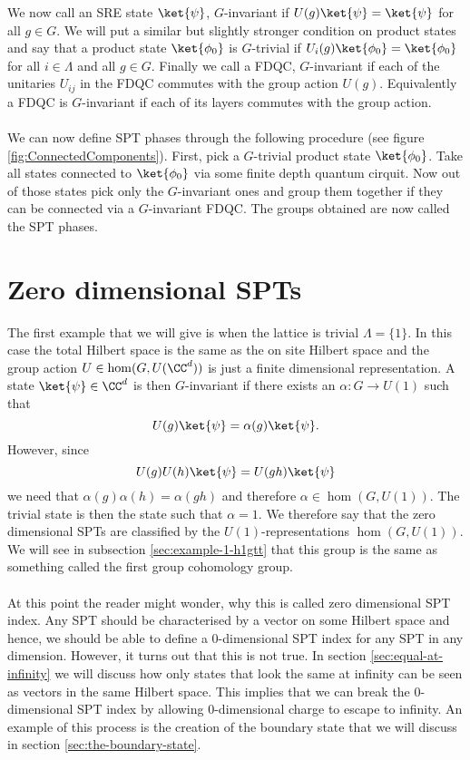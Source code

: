We now call an SRE state $\ket{\psi}$, $G$-invariant if $U(g)\ket{\psi}=\ket{\psi}$ for all $g\in G$. We will put a similar but slightly stronger condition on product states and say that a product state $\ket{\phi_0}$ is $G$-trivial if $U_i(g)\ket{\phi_0}=\ket{\phi_0}$ for all $i\in\Lambda$ and all $g\in G$. Finally we call a FDQC, $G$-invariant if each of the unitaries $U_{ij}$ in the FDQC commutes with the group action $U(g)$. Equivalently a FDQC is $G$-invariant if each of its layers commutes with the group action.\\\\
We can now define SPT phases through the following procedure (see figure \ref{fig:ConnectedComponents}). First, pick a $G$-trivial product state $\ket{\phi_0}$. Take all states connected to $\ket{\phi_0}$ via some finite depth quantum cirquit. Now out of those states pick only the $G$-invariant ones and group them together if they can be connected via a $G$-invariant FDQC. The groups obtained are now called the SPT phases.
\section{Zero dimensional SPTs}\label{sec:zero-dimensional-spts}The first example that we will give is when the lattice is trivial $\Lambda=\{1\}$. In this case the total Hilbert space is the same as the on site Hilbert space and the group action $U\in\hom(G,U(\CC^d))$ is just a finite dimensional representation. A state $\ket{\psi}\in\CC^d$ is then $G$-invariant if there exists an $\alpha:G\rightarrow U(1)$ such that
\begin{equation}
U(g)\ket{\psi}=\alpha(g)\ket{\psi}.
\end{equation}
However, since
\begin{equation}
U(g)U(h)\ket{\psi}=U(gh)\ket{\psi}
\end{equation}
we need that $\alpha(g)\alpha(h)=\alpha(gh)$ and therefore $\alpha\in\hom(G,U(1))$. The trivial state is then the state such that $\alpha=1$. We therefore say that the zero dimensional SPTs are classified by the $U(1)$-representations $\hom(G,U(1))$. We will see in subsection \ref{sec:example-1-h1gtt} that this group is the same as something called the first group cohomology group.
\\\\
At this point the reader might wonder, why this is called zero dimensional SPT index. Any SPT should be characterised by a vector on some Hilbert space and hence, we should be able to define a 0-dimensional SPT index for any SPT in any dimension. However, it turns out that this is not true. In section \ref{sec:equal-at-infinity} we will discuss how only states that look the same at infinity can be seen as vectors in the same Hilbert space. This implies that we can break the 0-dimensional SPT index by allowing 0-dimensional charge to escape to infinity. An example of this process is the creation of the boundary state that we will discuss in section \ref{sec:the-boundary-state}.
